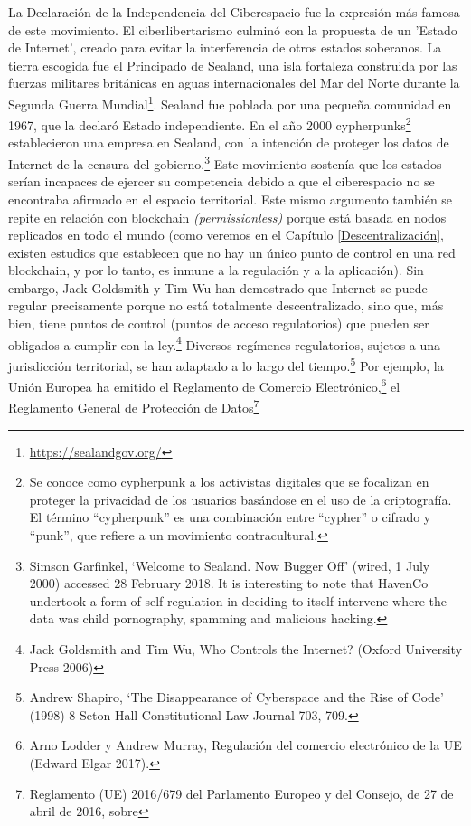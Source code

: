 \documentclass[12pt]{report} %
\begin{document}
  La Declaración de la Independencia del Ciberespacio fue la expresión más famosa de este movimiento.  El ciberlibertarismo culminó con la propuesta de un 'Estado de Internet', creado para evitar la interferencia de otros estados soberanos. La tierra escogida fue el Principado de Sealand, una isla fortaleza construida por las fuerzas militares británicas en aguas internacionales del Mar del Norte durante la Segunda Guerra Mundial\footnote{\url{https://sealandgov.org/}}.  Sealand fue poblada por una pequeña comunidad en 1967, que la declaró Estado independiente. En el año 2000 cypherpunks\footnote{Se conoce como cypherpunk a los activistas digitales que se focalizan en proteger la privacidad de los usuarios basándose en el uso de la criptografía. El término “cypherpunk” es una combinación entre “cypher” o cifrado y “punk”, que refiere a un movimiento contracultural.}  establecieron una empresa en Sealand, con la intención de proteger los datos de Internet de la censura del gobierno.\footnote{Simson Garfinkel, ‘Welcome to Sealand. Now Bugger Off’ (wired, 1 July 2000) accessed 28 February 2018. It is interesting to note that HavenCo undertook a form of self-regulation in deciding to itself intervene where the data was child pornography, spamming and malicious hacking.}  Este movimiento sostenía que los estados serían incapaces de ejercer su competencia debido a que el ciberespacio no se encontraba afirmado en el espacio territorial. Este mismo argumento también se repite en relación con blockchain \textit{(permissionless)} porque está basada en nodos replicados en todo el mundo (como veremos en el Capítulo \ref{Descentralización}, existen estudios que establecen que no hay un único punto de control en una red blockchain, y por lo tanto, es inmune a la regulación y a la aplicación). Sin embargo, Jack Goldsmith y Tim Wu han demostrado que Internet se puede regular precisamente porque no está totalmente descentralizado, sino que, más bien, tiene puntos de control (puntos de acceso regulatorios) que pueden ser obligados a cumplir con la ley.\footnote{Jack Goldsmith and Tim Wu, Who Controls the Internet? (Oxford University Press 2006)}  Diversos regímenes regulatorios, sujetos a una jurisdicción territorial, se han adaptado a lo largo del tiempo.\footnote{Andrew Shapiro, ‘The Disappearance of Cyberspace and the Rise of Code’ (1998) 8 Seton Hall Constitutional Law Journal 703, 709.}  Por ejemplo, la Unión Europea ha emitido el Reglamento de Comercio Electrónico,\footnote{Arno Lodder y Andrew Murray, Regulación del comercio electrónico de la UE (Edward Elgar 2017). }  el Reglamento General de Protección de Datos\footnote{Reglamento (UE) 2016/679 del Parlamento Europeo y del Consejo, de 27 de abril de 2016, sobre
}
\end{document}
